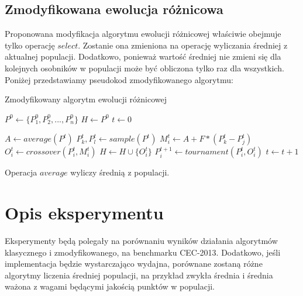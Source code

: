 \documentclass{scrartcl}
\begin{document}
\pagebreak
\subsection{Zmodyfikowana ewolucja różnicowa}

Proponowana modyfikacja algorytmu ewolucji różnicowej właściwie obejmuje tylko operację $select$. Zostanie ona zmieniona na operację wyliczania średniej z aktualnej populacji. Dodatkowo, ponieważ wartość średniej nie zmieni się dla kolejnych osobników w populacji może być obliczona tylko raz dla wszystkich. Poniżej przedstawiamy pseudokod zmodyfikowanego algorytmu:

\vspace{5mm}

\begin{algorithm}
\caption{Zmodyfikowany algorytm ewolucji różnicowej}\label{euclid}
\begin{algorithmic}

\State $P^0 \gets \{ P^0_1, P^0_2, ... , P^0_n\}$
\State $H \gets P^0$
\State $t \gets 0$

\State $A \gets average(P^t)$
\vspace{1mm}
\State $P^t_k, P^t_l \gets sample(P^t)$
\vspace{1mm}
\State $M^t_i \gets A + F * (P^t_k - P^t_j)$
\vspace{1mm}
\State $O^t_i \gets crossover(P^t_i, M^t_i)$
\vspace{1mm}
\State $H \gets H \cup \{O^t_i\}$
\vspace{1mm}
\State $P^{t+1}_i \gets tournament(P^t_i, O^t_i)$
\vspace{1mm}
\EndFor
\State $t \gets t+1$
\EndWhile

\EndProcedure
\end{algorithmic}
\end{algorithm}

Operacja $average$ wyliczy średnią z populacji.

\section{Opis eksperymentu}

Eksperymenty będą polegały na porównaniu wyników działania algorytmów klasycznego i zmodyfikowanego, na benchmarku CEC-2013. Dodatkowo, jeśli implementacja będzie wystarczająco wydajna, porównane zostaną różne algorytmy liczenia średniej populacji, na przykład zwykła średnia i średnia ważona z wagami będącymi jakością punktów w populacji.
\end{document}
